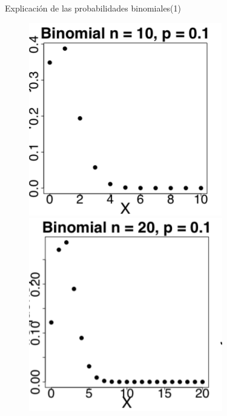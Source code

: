\documentclass[10pt]{beamer}
\begin{document}
\begin{frame}{Explicaci\'on de las probabilidades binomiales(1)}
\begin{figure}
	\centering
	\begin{minipage}{.3\textwidth}
		\includegraphics[width=0.8\linewidth]{v13}	
	\end{minipage}
	\begin{minipage}{.3\textwidth}
		\centering
		\includegraphics[width=0.8\linewidth]{v14}
	\end{minipage}
	\begin{minipage}{.3\textwidth}
		\centering

\end{minipage}
\end{figure}
\end{frame}
\end{document}
